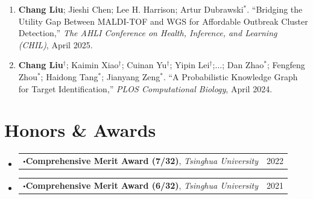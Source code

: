 \documentclass[letterpaper,11pt]{article}
\makeatletter
\newcommand{\sbullet}[1][.5]{\mathbin{\vcenter{\hbox{\scalebox{#1}{$\bullet$}}}}}
\newcommand{\resumeAward}[3]{
    \item[]\hspace*{-\leftmargin}%
    \begin{tabular*}{\dimexpr\linewidth+\leftmargin\relax}{@{}l@{\extracolsep{\fill}}r@{}}\textbf{$\sbullet$\hspace{0.5em}\small #1}, \textit{\small #2} & \small #3 \\
    \end{tabular*}\vspace{-7pt}
}
\newcommand{\resumeLongAward}[3]{
    \item[]
    \begin{tabular*}{0.94\textwidth}{l@{\extracolsep{\fill}}r}
      \textbf{$\sbullet$ \small#1},\\ \textit{\ \ \small #2} & \small #3 \\
    \end{tabular*}\vspace{-7pt}
}
\newcommand{\resumeAwardListStart}{\begin{itemize}[itemsep=4pt, parsep=2pt]}
\newcommand{\resumeAwardListEnd}{\end{itemize}\vspace{0pt}}
\makeatother
\begin{document}
\begin{enumerate}
    \item \textbf{Chang Liu}; Jieshi Chen; Lee H. Harrison; Artur Dubrawski$^*$. ``Bridging the Utility Gap Between MALDI-TOF and WGS for Affordable Outbreak Cluster Detection,'' \textit{The AHLI Conference on Health, Inference, and Learning (CHIL)}, April 2025.
    
  
    \item \textbf{Chang Liu$^\dag$}; Kaimin Xiao$^\dag$; Cuinan Yu$^\dag$; Yipin Lei$^\dag$;...;
    Dan Zhao$^*$; Fengfeng Zhou$^*$; Haidong Tang$^*$; Jianyang Zeng$^*$. 
  ``A Probabilistic Knowledge Graph for Target Identification,'' \textit{PLOS Computational Biology}, April 2024.
  
\end{enumerate}

\section{Honors \& Awards}
 \resumeAwardListStart
  \resumeAward{Comprehensive Merit Award (7/32)}{Tsinghua University}{2022}
  \resumeAward{Comprehensive Merit Award (6/32)}{Tsinghua University}{2021}
 \resumeAwardListEnd
\end{document}
